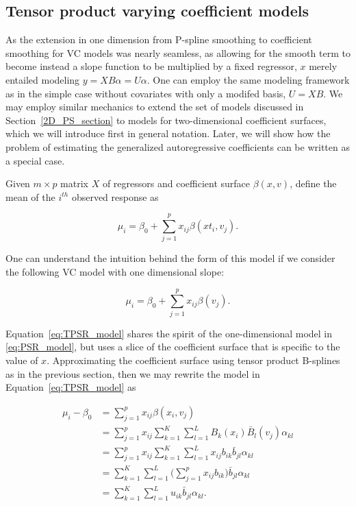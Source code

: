 \documentclass[12pt]{article}
\newcommand*\needsparaphrased{\color{red}}
\theoremstyle{definition}
\begin{document}
\subsection{ Tensor product varying coefficient models }

As the extension in one dimension from P-spline smoothing to coefficient smoothing for VC models was nearly seamless, as allowing for the smooth term to become instead a slope function to be multiplied by a fixed regressor, $x$ merely entailed modeling $y = X B \alpha = U \alpha$. One can employ the same modeling framework as in the simple case without covariates with only a modifed basis, $U = XB$.  We may employ similar mechanics to extend the set of models discussed in Section~\ref{2D_PS_section} to models for two-dimensional coefficient surfaces, which we will introduce first in general notation. Later, we will show how the problem of estimating the generalized autoregressive coefficients can be written as a special case.

Given $m \times p$ matrix $X$ of regressors and coefficient surface $\beta\left(x,v\right)$, define the mean of the $i^{th}$ observed response as

\begin{equation} \label{eq:TPSR_model} 
\mu_i = \beta_0 + \sum_{j=1}^p x_{ij} \beta\left(xt_i,v_j\right).
\end{equation}

One can understand the intuition behind the form of this model if we consider the following VC model with one dimensional slope:

\begin{equation} \label{eq:PSR_model}
\mu_i = \beta_0 +  \sum_{j=1}^p x_{ij} \beta\left(v_j\right).
\end{equation}

{
\needsparaphrased{
[ Relate this simplification back to the models for $\phi$ that involve smoothing down each diagonal of $T$ separately. ]
}
}

Equation~\ref{eq:TPSR_model} shares the spirit of the one-dimensional model in \ref{eq:PSR_model}, but uses a slice of the coefficient surface that is specific to the value of $x$. Approximating the coefficient surface using tensor product B-splines as in the previous section, then we may rewrite the model in Equation~\ref{eq:TPSR_model} as

\begin{align}
\mu_i - \beta_0 &= \sum_{j=1}^p x_{ij} \beta\left(x_i,v_j\right) \nonumber \\
&= \sum_{j=1}^p x_{ij} \sum_{k=1}^K \sum_{l=1}^L B_k\left( x_i \right) \bar{B}_l\left( v_j \right) \alpha_{kl} \nonumber \\
&= \sum_{j=1}^p x_{ij} \sum_{k=1}^K \sum_{l=1}^L x_{ij} b_{ik} \bar{b}_{jl} \alpha_{kl} \nonumber \\
&=  \sum_{k=1}^K \sum_{l=1}^L \bigg(\sum_{j=1}^p x_{ij} b_{ik} \bigg) \bar{b}_{jl} \alpha_{kl} \nonumber \\ 
&=  \sum_{k=1}^K \sum_{l=1}^L u_{ik} \bar{b}_{jl} \alpha_{kl}. \label{eq:2D_PS_VC_model_unvectorized}
\end{align}
\end{document}
